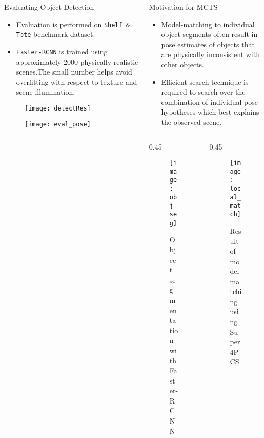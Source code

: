 \begin{columns}[t]
	\begin{column}{0.30\textwidth}
		\begin{block} {\large Evaluating Object Detection}
			\centering
			\begin{itemize}
				\item Evaluation is performed on {\tt Shelf \& Tote} benchmark dataset.
				\item {\tt Faster-RCNN} is trained using approximately 2000 physically-realistic scenes.The small number helps avoid overfitting with respect to texture and scene illumination.
			\end{itemize}
			\begin{figure}[h]
				\texttt{[image: detectRes]}
			\end{figure}
			\vspace{-0.1in}
			\begin{figure}[h]
				\texttt{[image: eval\_pose]}
			\end{figure}
		\end{block}
	\end{column}
	\begin{column}{0.28\textwidth}
		\begin{block}{\large Motivation for MCTS}
			\centering
			\begin{itemize}
				\item Model-matching to individual object segments often result in pose estimates of objects that are physically inconsistent with other objects.
				\item Efficient search technique is required to search over the combination of individual pose hypotheses which best explains the observed scene.
			\end{itemize}
			\vspace{0.3in}
			\begin{columns}[t]
			\begin{column} {0.45\textwidth}
			\begin{figure}[h]
				\texttt{[image: obj\_seg]}
				\caption{Object segmentation with Faster-RCNN}
			\end{figure}
			\end{column}
			\begin{column} {0.45\textwidth}
			\begin{figure}[h]
				\texttt{[image: local\_match]}
				\caption{Result of model-matching using Super4PCS}
			\end{figure}
			\end{column}
			\end{columns}
		\end{block}
	\end{column}
\end{columns}



